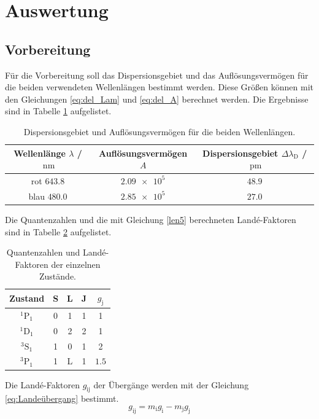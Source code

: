 \section{Auswertung}
\label{sec:Auswertung}
\subsection{Vorbereitung}
Für die Vorbereitung soll das Dispersionsgebiet und das Auflösungsvermögen für die beiden 
verwendeten Wellenlängen bestimmt werden. Diese Größen können mit den Gleichungen \eqref{eq:del_Lam} und \eqref{eq:del_A} berechnet werden.
Die Ergebnisse sind in Tabelle \ref{tab:Vorbereitung} aufgelistet.
\FloatBarrier
\begin{table}
    \centering
    \caption{Dispersionsgebiet und Auflösungsvermögen für die beiden Wellenlängen.}
    \label{tab:Vorbereitung}
    \begin{tabular}{c c c}
        \toprule
        Wellenlänge $\lambda$ / $\SI{}{\nano\meter}$&Auflösungsvermögen $A$& Dispersionsgebiet $\Delta \lambda_{\text{D}}$ / $\SI{}{\pico\meter}$\\
        \midrule
        rot $\num{643.8}$&$\num{2.09e5}$&$\num{48.9}$\\
        blau $\num{480.0}$&$\num{2.85e5}$&$\num{27.0}$\\
        \bottomrule
    \end{tabular}
\end{table}
\FloatBarrier
Die Quantenzahlen und die mit Gleichung \eqref{len5} berechneten Landé-Faktoren sind in Tabelle \ref{tab:Quantenzahlen} 
aufgelistet.
\FloatBarrier
\begin{table}
    \centering
    \caption{Quantenzahlen und Landé-Faktoren der einzelnen Zustände.}
    \label{tab:Quantenzahlen}
    \begin{tabular}{c c c c c}
        \toprule
        Zustand&S&L&J&$g_{\text{j}}$\\
        \midrule
        $^1\text{P}_1$&0&1&1&1\\
        $^1\text{D}_1$&0&2&2&1\\
        $^3\text{S}_1$&1&0&1&2\\
        $^3\text{P}_1$&1&L&1&$\num{1.5}$\\
        \bottomrule
    \end{tabular}
\end{table}
\FloatBarrier
Die Landé-Faktoren $g_{\text{ij}}$ der Übergänge werden mit der Gleichung \eqref{eq:Landeübergang} bestimmt.
\begin{equation}
    \label{eq:Landeübergang}
    g_{\text{ij}} = m_{\text{i}}g_{\text{i}} - m_{\text{j}}g_{\text{j}}
\end{equation}
